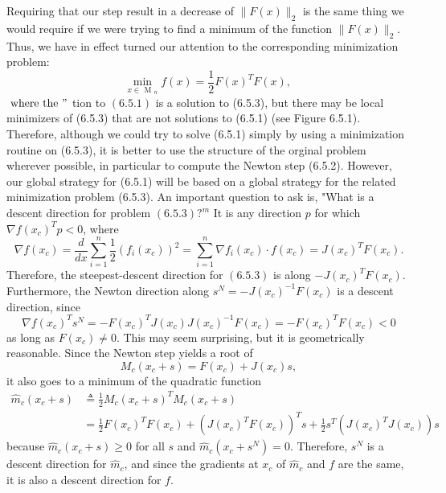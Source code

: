 Requiring that our step result in a decrease of \(\|F(x)\|_{2}\) is the same thing we would require if we were trying to find a minimum of the function \(\|F(x)\|_{2}\). Thus, we have in effect turned our attention to the corresponding minimization problem:
\[
\min _{x \in \text { M }_{n}} f(x)=\frac{1}{2} F(x)^{T} F(x) \text {, }
\]
\(\mathrm{~ w h e r e ~ t h e ~ "}\) tion to \((6.5 .1)\) is a solution to (6.5.3), but there may be local minimizers of (6.5.3) that are not solutions to (6.5.1) (see Figure 6.5.1). Therefore, although we could try to solve (6.5.1) simply by using a minimization routine on (6.5.3), it is better to use the structure of the orginal problem wherever possible, in particular to compute the Newton step (6.5.2). However, our global strategy for (6.5.1) will be based on a global strategy for the related minimization problem (6.5.3).
An important question to ask is, "What is a descent direction for problem \((6.5 .3) ?^{m}\) It is any direction \(p\) for which \(\nabla f\left(x_{c}\right)^{T} p<0\), where
\[
\nabla f\left(x_{c}\right)=\frac{d}{d x} \sum_{i=1}^{n} \frac{1}{2}\left(f_{i}\left(x_{c}\right)\right)^{2}=\sum_{i=1}^{n} \nabla f_{i}\left(x_{c}\right) \cdot f\left(x_{c}\right)=J\left(x_{c}\right)^{T} F\left(x_{c}\right) .
\]
Therefore, the steepest-descent direction for \((6.5 .3)\) is along \(-J\left(x_{c}\right)^{T} F\left(x_{c}\right)\). Furthermore, the Newton direction along \(s^{N}=-J\left(x_{c}\right)^{-1} F\left(x_{c}\right)\) is a descent direction, since
\[
\nabla f\left(x_{c}\right)^{T} s^{N}=-F\left(x_{c}\right)^{T} J\left(x_{c}\right) J\left(x_{c}\right)^{-1} F\left(x_{c}\right)=-F\left(x_{c}\right)^{T} F\left(x_{c}\right)<0
\]
as long as \(F\left(x_{c}\right) \neq 0\). This may seem surprising, but it is geometrically reasonable. Since the Newton step yields a root of
\[
M_{c}\left(x_{c}+s\right)=F\left(x_{c}\right)+J\left(x_{c}\right) s,
\]
it also goes to a minimum of the quadratic function
\[
\begin{aligned}
\hat{m}_{c}\left(x_{c}+s\right) & \triangleq \frac{1}{2} M_{c}\left(x_{c}+s\right)^{T} M_{c}\left(x_{c}+s\right) \\
&=\frac{1}{2} F\left(x_{c}\right)^{T} F\left(x_{c}\right)+\left(J\left(x_{c}\right)^{T} F\left(x_{c}\right)\right)^{T} s+\frac{1}{2} s^{T}\left(J\left(x_{c}\right)^{T} J\left(x_{c}\right)\right) s
\end{aligned}
\]
because \(\hat{m}_{c}\left(x_{c}+s\right) \geq 0\) for all \(s\) and \(\hat{m}_{c}\left(x_{c}+s^{N}\right)=0\). Therefore, \(s^{N}\) is a descent direction for \(\hat{m}_{c}\), and since the gradients at \(x_{c}\) of \(\hat{m}_{c}\) and \(f\) are the same, it is also a descent direction for \(f\).

